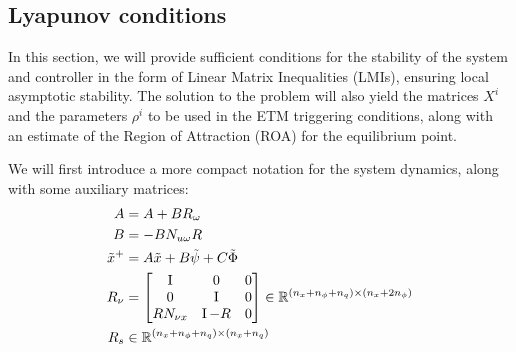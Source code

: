 \documentclass{ifacconf}
\theoremstyle{plain}
\begin{document}
\subsection{Lyapunov conditions}
In this section, we will provide sufficient conditions for the stability of the system and controller in the form of Linear Matrix Inequalities (LMIs), ensuring local asymptotic stability. The solution to the problem will also yield the matrices $X^i$ and the parameters $\rho^i$ to be used in the ETM triggering conditions, along with an estimate of the Region of Attraction (ROA) for the equilibrium point.

We will first introduce a more compact notation for the system dynamics, along with some auxiliary matrices:
\begin{equation}\label{eqn:auxiliary}
\begin{aligned}
    \relax{A} &= A + B R_{\omega}\\
    \relax{B} &= -B N_{u \omega} R\\
    \tilde{x}^+ &= \relax{A}\tilde{x} + \relax{B}\tilde{\psi} + C \tilde{\Phi}\\
R_{\nu} &= \left[\begin{matrix}
  \operatorname{I} & 0 & 0 \\
  0 & \operatorname{I} & 0 \\
  R N_{\nu x} & \operatorname{I} - R & 0\\
\end{matrix}\right] \in {\mathbb{R}}^{(n_x + n_{\phi} + n_q) \times (n_x + 2 n_{\phi})}\\
R_s &\in {\mathbb{R}}^{(n_x + n_{\phi} + n_q) \times (n_x + n_q)}
\end{aligned}
\end{equation}
\end{document}
